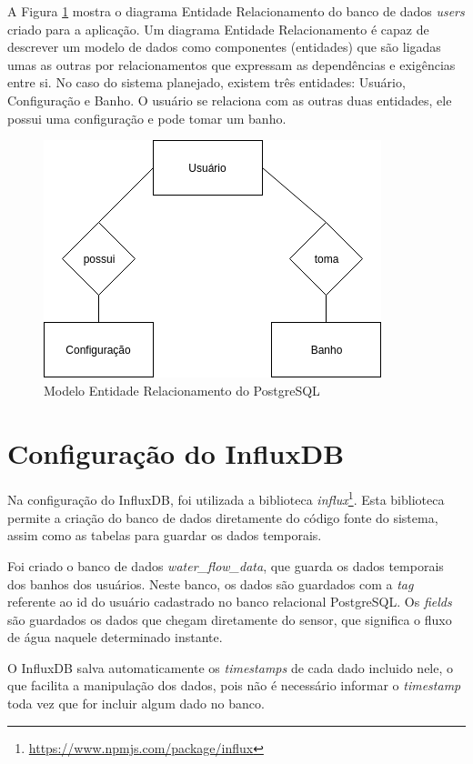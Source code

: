 A Figura \ref{fig:erpostgre} mostra o diagrama Entidade Relacionamento do banco de dados \textit{users} criado para a aplicação. Um diagrama Entidade Relacionamento é capaz de descrever um modelo de dados como componentes (entidades) que são ligadas umas as outras por relacionamentos que expressam as dependências e exigências entre si. No caso do sistema planejado, existem três entidades: Usuário, Configuração e Banho. O usuário se relaciona com as outras duas entidades, ele possui uma configuração e pode tomar um banho.

\begin{figure}[htbp]
	\centering
	\includegraphics[width=0.6\linewidth]{figuras/ERPostgre.png}
	\caption{Modelo Entidade Relacionamento do PostgreSQL}
	\label{fig:erpostgre}
\end{figure}


\section{Configuração do InfluxDB}

Na configuração do InfluxDB, foi utilizada a biblioteca \textit{influx}\footnote{\url{https://www.npmjs.com/package/influx}}. Esta biblioteca permite a criação do banco de dados diretamente do código fonte do sistema, assim como as tabelas para guardar os dados temporais.

Foi criado o banco de dados \textit{water\_flow\_data}, que guarda os dados temporais dos banhos dos usuários. Neste banco, os dados são guardados com a \textit{tag} referente ao id do usuário cadastrado no banco relacional PostgreSQL. Os \textit{fields} são guardados os dados que chegam diretamente do sensor, que significa o fluxo de água naquele determinado instante.

O InfluxDB salva automaticamente os \textit{timestamps} de cada dado incluido nele, o que facilita a manipulação dos dados, pois não é necessário informar o \textit{timestamp} toda vez que for incluir algum dado no banco.

